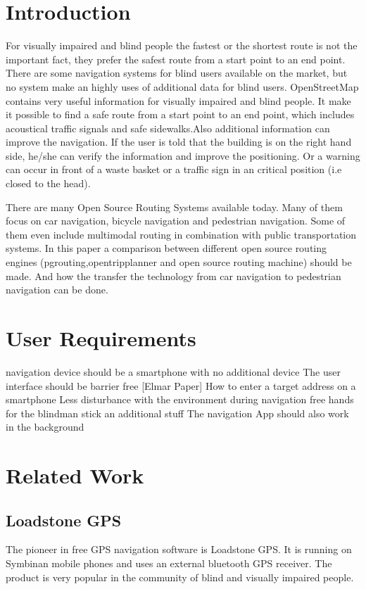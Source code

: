 \documentclass{sig-alternate}
\begin{document}

\section{Introduction}
For visually impaired and blind people the fastest or the shortest route is not the important fact, they prefer the safest route from a start point to an end point. There are some navigation systems for blind users available on the market, but no system make an highly uses of additional data for blind users. 
OpenStreetMap contains very useful information for visually impaired and blind people. It make it possible to find a safe route from a start point to an end point, which includes acoustical traffic signals and safe sidewalks.Also additional information can improve the navigation. If the user is told that the building is on the right hand side, he/she can verify the information and improve the positioning. Or a warning can occur in front of a waste basket or a traffic sign in an critical position (i.e closed to the head). 
 
There are many Open Source Routing Systems available today. Many of them focus on car navigation, bicycle navigation and pedestrian navigation. Some of them even include multimodal routing in combination with public transportation systems. In this paper a comparison between different open source routing engines (pgrouting,opentripplanner and open source routing machine) should be made. And how the transfer the technology from car navigation to pedestrian navigation can be done. 
\section{User Requirements}
navigation device should be a smartphone with no additional device
The user interface should be barrier free [Elmar Paper]
How to enter a target address on a smartphone
Less disturbance with the environment
during navigation free hands for the blindman stick an additional stuff
The navigation App should also work in the background

\section{Related Work}

\subsection{Loadstone GPS}
The pioneer in free GPS navigation software is Loadstone GPS\cite{loadstone}. It is running on Symbinan mobile phones and uses an external bluetooth GPS receiver. The product is very popular in the community of blind and visually impaired people.
\end{document}
